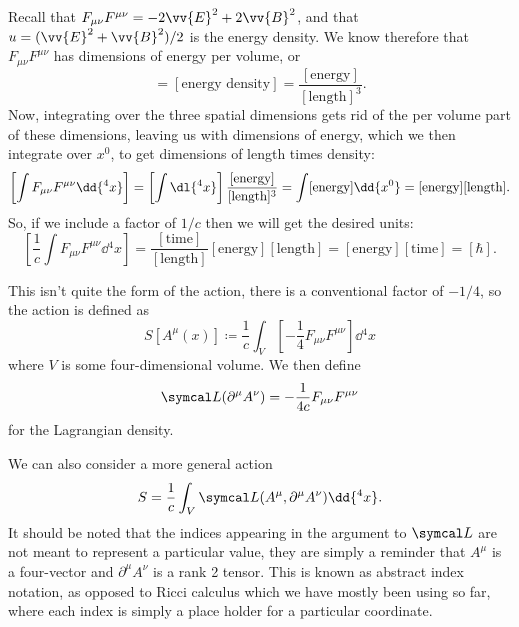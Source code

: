 Recall that \(F_{\mu\nu}F^{\mu\nu} = -2\vv{E}^2 + 2\vv{B}^2\), and that \(u = (\vv{E}^2 + \vv{B}^2)/2\) is the energy density.
We know therefore that \(F_{\mu\nu}F^{\mu\nu}\) has dimensions of energy per volume, or
\begin{equation}
    [F_{\mu\nu}F^{\mu\nu}] = [\text{energy density}] = \frac{[\text{energy}]}{[\text{length}]^3}.
\end{equation}
Now, integrating over the three spatial dimensions gets rid of the per volume part of these dimensions, leaving us with dimensions of energy, which we then integrate over \(x^0\), to get dimensions of length times density:
\begin{equation*}
    \left[ \int F_{\mu\nu}F^{\mu\nu} \dd{^4x} \right] = \left[ \int \dl{^4x} \right] \frac{[\text{energy}]}{[\text{length}]^3} = \int [\text{energy}] \dd{x^0} = [\text{energy}][\text{length}].
\end{equation*}
So, if we include a factor of \(1/c\) then we will get the desired units:
\begin{equation*}
    \left[ \frac{1}{c} \int F_{\mu\nu}F^{\mu\nu} \dd{^4x} \right] = \frac{[\text{time}]}{[\text{length}]} [\text{energy}][\text{length}] = [\text{energy}][\text{time}] = [\hbar].
\end{equation*}

This isn't quite the form of the action, there is a conventional factor of \(-1/4\), so the action is defined as
\begin{equation}
    S[A^\mu(x)] \coloneqq \frac{1}{c}\int_V \left[ -\frac{1}{4}F_{\mu\nu}F^{\mu\nu} \right] \dd{^4x}
\end{equation}
where \(V\) is some four-dimensional volume.
We then define
\begin{equation}
    \lagrangianDensity(\partial^\mu A^\nu) = -\frac{1}{4c} F_{\mu\nu}F^{\mu\nu}
\end{equation}
for the Lagrangian density.

We can also consider a more general action
\begin{equation}
    S = \frac{1}{c} \int_V \lagrangianDensity(A^\mu, \partial^\mu A^\nu) \dd{^4x}.
\end{equation}
It should be noted that the indices appearing in the argument to \(\lagrangianDensity\) are not meant to represent a particular value, they are simply a reminder that \(A^\mu\) is a four-vector and \(\partial^\mu A^\nu\) is a rank 2 tensor.
This is known as abstract index notation, as opposed to Ricci calculus which we have mostly been using so far, where each index is simply a place holder for a particular coordinate.

